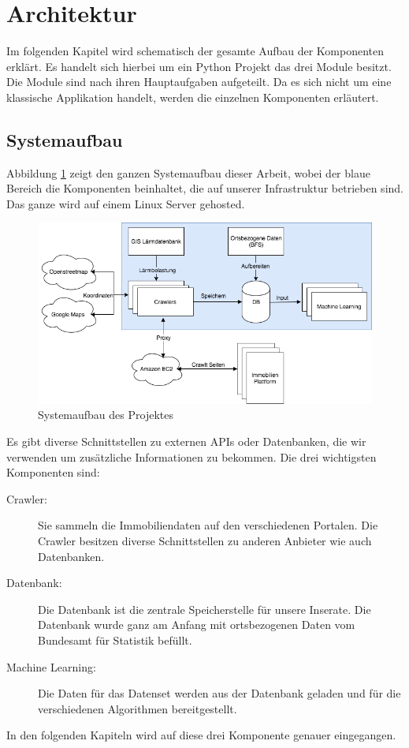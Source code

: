 \section{Architektur}
Im folgenden Kapitel wird schematisch der gesamte Aufbau der Komponenten erklärt. Es handelt sich hierbei um ein Python Projekt das drei Module besitzt. Die Module sind nach ihren Hauptaufgaben aufgeteilt. Da es sich nicht um eine klassische Applikation handelt, werden die einzelnen Komponenten erläutert.
%
\subsection{Systemaufbau}
Abbildung \ref{fig:system} zeigt den ganzen Systemaufbau dieser Arbeit, wobei der blaue Bereich die Komponenten beinhaltet, die auf unserer Infrastruktur betrieben sind. Das ganze wird auf einem Linux Server gehosted.\\
\begin{figure}[ht]
\centering
\includegraphics[width=\textwidth]{images/Architektur.png}
\caption[Systemaufbau des Projektes]{Systemaufbau des Projektes}%
\label{fig:system}
\end{figure}
Es gibt diverse Schnittstellen zu externen APIs oder Datenbanken, die wir verwenden um zusätzliche Informationen zu bekommen. Die drei wichtigsten Komponenten sind:
\begin{description}
\item[Crawler:] Sie sammeln die Immobiliendaten auf den verschiedenen Portalen. Die Crawler besitzen diverse Schnittstellen zu anderen Anbieter wie auch Datenbanken.
\item[Datenbank:] Die Datenbank ist die zentrale Speicherstelle für unsere Inserate. Die Datenbank wurde ganz am Anfang mit ortsbezogenen Daten vom Bundesamt für Statistik befüllt.
\item[Machine Learning:] Die Daten für das Datenset werden aus der Datenbank geladen und für die verschiedenen Algorithmen bereitgestellt.
\end{description}
In den folgenden Kapiteln wird auf diese drei Komponente genauer eingegangen.
%
